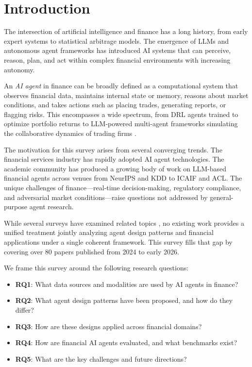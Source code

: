 \documentclass[12pt]{report}
\begin{document}
\newpage
\tableofcontents

\chapter{Introduction}

The intersection of artificial intelligence and finance has a long history, from early expert systems to statistical arbitrage models. The emergence of LLMs and autonomous agent frameworks has introduced AI systems that can perceive, reason, plan, and act within complex financial environments with increasing autonomy.

An \textit{AI agent} in finance can be broadly defined as a computational system that observes financial data, maintains internal state or memory, reasons about market conditions, and takes actions such as placing trades, generating reports, or flagging risks. This encompasses a wide spectrum, from DRL agents trained to optimize portfolio returns \citep{liu2020finrl,liu2021finrl} to LLM-powered multi-agent frameworks simulating the collaborative dynamics of trading firms \citep{xiao2024tradingagents,yu2024fincon}.

The motivation for this survey arises from several converging trends. The financial services industry has rapidly adopted AI agent technologies. The academic community has produced a growing body of work on LLM-based financial agents across venues from NeurIPS and KDD to ICAIF and ACL. The unique challenges of finance---real-time decision-making, regulatory compliance, and adversarial market conditions---raise questions not addressed by general-purpose agent research.

While several surveys have examined related topics \citep{ding2024llm_trading_survey,nie2025survey,li2024surveyfinance,lee2024surveyfinllm,liu2024surveyfinai,saha2025investmentmgmt}, no existing work provides a unified treatment jointly analyzing agent design patterns and financial applications under a single coherent framework. This survey fills that gap by covering over 80 papers published from 2024 to early 2026.

We frame this survey around the following research questions:
\begin{itemize}[leftmargin=2em]
    \item \textbf{RQ1}: What data sources and modalities are used by AI agents in finance?
    \item \textbf{RQ2}: What agent design patterns have been proposed, and how do they differ?
    \item \textbf{RQ3}: How are these designs applied across financial domains?
    \item \textbf{RQ4}: How are financial AI agents evaluated, and what benchmarks exist?
    \item \textbf{RQ5}: What are the key challenges and future directions?
\end{itemize}
\end{document}
